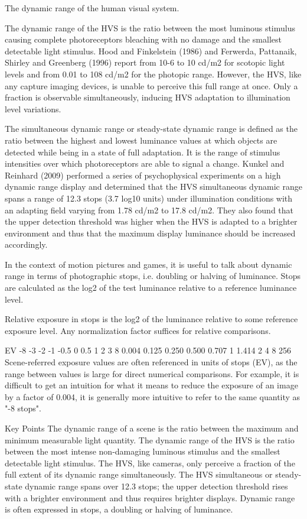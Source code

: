 The dynamic range of the human visual system.

The dynamic range of the HVS is the ratio between the most luminous stimulus causing complete photoreceptors bleaching with no damage and the smallest detectable light stimulus. Hood and Finkelstein (1986) and Ferwerda, Pattanaik, Shirley and Greenberg (1996) report from 10-6 to 10 cd/m2 for scotopic light levels and from 0.01 to 108 cd/m2 for the photopic range. However, the HVS, like any capture imaging devices, is unable to perceive this full range at once. Only a fraction is observable simultaneously, inducing HVS adaptation to illumination level variations.

The simultaneous dynamic range or steady-state dynamic range is defined as the ratio between the highest and lowest luminance values at which objects are detected while being in a state of full adaptation. It is the range of stimulus intensities over which photoreceptors are able to signal a change. Kunkel and Reinhard (2009) performed a series of psychophysical experiments on a high dynamic range display and determined that the HVS simultaneous dynamic range spans a range of 12.3 stops (3.7 log10 units) under illumination conditions with an adapting field varying from 1.78 cd/m2 to 17.8 cd/m2. They also found that the upper detection threshold was higher when the HVS is adapted to a brighter environment and thus that the maximum display luminance should be increased accordingly.

In the context of motion pictures and games, it is useful to talk about dynamic range in terms of photographic stops, i.e. doubling or halving of luminance. Stops are calculated as the log2 of the test luminance relative to a reference luminance level.

Relative exposure in stops is the log2 of the luminance relative to some reference exposure level. Any normalization factor suffices for relative comparisons.

EV
-8
-3
-2
-1
-0.5
0
0.5
1
2
3
8
0.004
0.125
0.250
0.500
0.707
1
1.414
2
4
8
256
Scene-referred exposure values are often referenced in units of stops (EV), as the range between values is large for direct numerical comparisons. For example, it is difficult to get an intuition for what it means to reduce the exposure of an image by a factor of 0.004, it is generally more intuitive to refer to the same quantity as "-8 stops".

Key Points
The dynamic range of a scene is the ratio between the maximum and minimum measurable light quantity.
The dynamic range of the HVS is the ratio between the most intense non-damaging luminous stimulus and the smallest detectable light stimulus.
The HVS, like cameras, only perceive a fraction of the full extent of its dynamic range simultaneously.
The HVS simultaneous or steady-state dynamic range spans over 12.3 stops; the upper detection threshold rises with a brighter environment and thus requires brighter displays.
Dynamic range is often expressed in stops, a doubling or halving of luminance.

